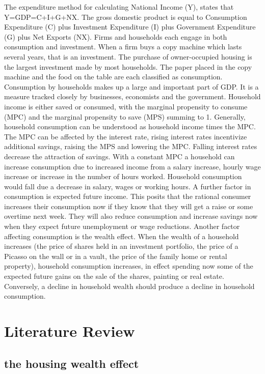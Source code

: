 \documentclass[12pt,a4paper,]{article}
\begin{document}
The expenditure method for calculating National Income (Y), states that
Y=GDP=C+I+G+NX. The gross domestic product is equal to Consumption
Expenditure (C) plus Investment Expenditure (I) plus Government
Expenditure (G) plus Net Exports (NX). Firms and households each engage
in both consumption and investment. When a firm buys a copy machine
which lasts several years, that is an investment. The purchase of
owner-occupied housing is the largest investment made by most
households. The paper placed in the copy machine and the food on the
table are each classified as consumption. Consumption by households
makes up a large and important part of GDP. It is a measure tracked
closely by businesses, economists and the government. Household income
is either saved or consumed, with the marginal propensity to consume
(MPC) and the marginal propensity to save (MPS) summing to 1. Generally,
household consumption can be understood as household income times the
MPC. The MPC can be affected by the interest rate, rising interest rates
incentivize additional savings, raising the MPS and lowering the MPC.
Falling interest rates decrease the attraction of savings. With a
constant MPC a household can increase consumption due to increased
income from a salary increase, hourly wage increase or increase in the
number of hours worked. Household consumption would fall due a decrease
in salary, wages or working hours. A further factor in consumption is
expected future income. This posits that the rational consumer increases
their consumption now if they know that they will get a raise or some
overtime next week. They will also reduce consumption and increase
savings now when they expect future unemployment or wage reductions.
Another factor affecting consumption is the wealth effect. When the
wealth of a household increases (the price of shares held in an
investment portfolio, the price of a Picasso on the wall or in a vault,
the price of the family home or rental property), household consumption
increases, in effect spending now some of the expected future gains on
the sale of the shares, painting or real estate. Conversely, a decline
in household wealth should produce a decline in household consumption.

\section{Literature Review}\label{literature-review}

\subsection{the housing wealth effect}\label{the-housing-wealth-effect}
\end{document}
